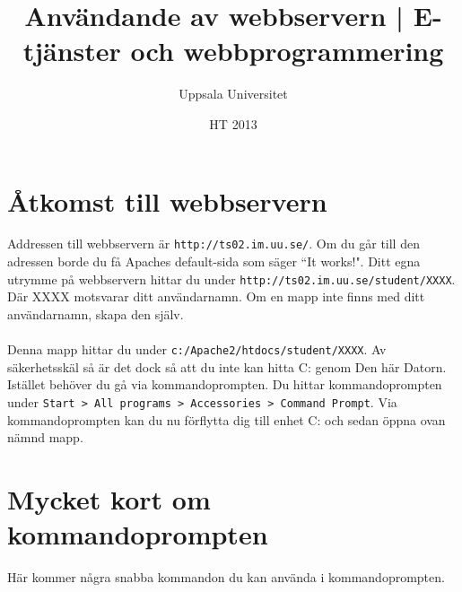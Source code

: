 \documentclass{article}
\begin{document}
  \title{ Användande av webbservern | E-tjänster och webbprogrammering }
  \author{ Uppsala Universitet }
  \date{ HT 2013 }
  \maketitle

  \lstset{language=PHP}

  \section{Åtkomst till webbservern}
    Addressen till webbservern är \texttt{http://ts02.im.uu.se/}. Om du går till den adressen borde du få Apaches default-sida som säger ``It works!". Ditt egna utrymme på webbservern hittar du under \texttt{http://ts02.im.uu.se/student/XXXX}. Där XXXX motsvarar ditt användarnamn. Om en mapp inte finns med ditt användarnamn, skapa den själv.

  \paragraph{}
    Denna mapp hittar du under \texttt{c:/Apache2/htdocs/student/XXXX}. Av säkerhetsskäl så är det dock så att du inte kan hitta C: genom Den här Datorn. Istället behöver du gå via kommandoprompten. Du hittar kommandoprompten under \texttt{Start > All programs > Accessories > Command Prompt}. Via kommandoprompten kan du nu förflytta dig till enhet C: och sedan öppna ovan nämnd mapp.

  \section{Mycket kort om kommandoprompten}
    Här kommer några snabba kommandon du kan använda i kommandoprompten.
\end{document}
